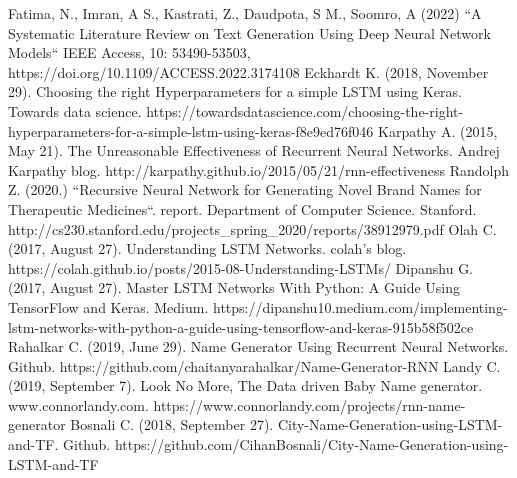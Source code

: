 \documentclass[conference]{IEEEtran}
\begin{document}
\begin{thebibliography}{00}
 Fatima, N., Imran, A S., Kastrati, Z., Daudpota, S M., Soomro, A (2022) ``A Systematic Literature Review on Text Generation Using Deep Neural Network Models``
IEEE Access, 10: 53490-53503, https://doi.org/10.1109/ACCESS.2022.3174108
 Eckhardt K. (2018, November 29). Choosing the right Hyperparameters for a simple LSTM using Keras. Towards data science. https://towardsdatascience.com/choosing-the-right-hyperparameters-for-a-simple-lstm-using-keras-f8e9ed76f046
 Karpathy A. (2015, May 21). The Unreasonable Effectiveness of Recurrent Neural Networks. Andrej Karpathy blog. http://karpathy.github.io/2015/05/21/rnn-effectiveness
 Randolph Z. (2020.) ``Recursive Neural Network for Generating Novel
Brand Names for Therapeutic Medicines``. report. Department of Computer Science. Stanford. http://cs230.stanford.edu/projects\_spring\_2020/reports/38912979.pdf
 Olah C. (2017, August 27). Understanding LSTM Networks. colah's blog. https://colah.github.io/posts/2015-08-Understanding-LSTMs/
 Dipanshu G. (2017, August 27). Master LSTM Networks With Python: A Guide Using TensorFlow and Keras. Medium. https://dipanshu10.medium.com/implementing-lstm-networks-with-python-a-guide-using-tensorflow-and-keras-915b58f502ce
 Rahalkar C. (2019, June 29). Name Generator Using Recurrent Neural Networks. Github. https://github.com/chaitanyarahalkar/Name-Generator-RNN
 Landy C. (2019, September 7). Look No More, The Data driven Baby Name generator. www.connorlandy.com. https://www.connorlandy.com/projects/rnn-name-generator
 Bosnali C. (2018, September 27). City-Name-Generation-using-LSTM-and-TF. Github. https://github.com/CihanBosnali/City-Name-Generation-using-LSTM-and-TF
\end{thebibliography}
\end{document}
